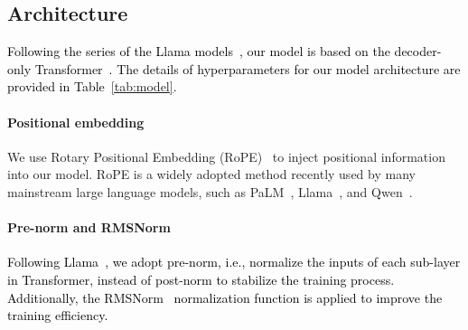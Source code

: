 \documentclass{article}
\begin{document}
\subsection{Architecture}
%

\textcolor{black}{
    Following the series of the Llama models~\citep{touvron2023llama,touvron2023llama2},
        our model is based on the decoder-only Transformer~\citep{vaswani2017transformer}.
    The details of hyperparameters for our model architecture are provided in Table~\ref{tab:model}.
}
\vspace{-10pt}
\begin{table}[htbp]
  \centering
  \normalsize
  \caption{ 
    The details of model architecture.
  }
  \label{tab:model}
\end{table}

%
\vspace{-1pt}
\paragraph{Positional embedding} 
We use Rotary Positional Embedding (RoPE)~\citep{su2021roformer} to inject positional information into our model.
RoPE is a widely adopted method recently used by many mainstream large language models, such as PaLM~\citep{anil2023palm}, Llama~\citep{touvron2023llama,touvron2023llama2}, and Qwen~\citep{bai2023qwen}.
\vspace{-1em}
\paragraph{Pre-norm and RMSNorm} 
\textcolor{black}{
%
Following Llama~\citep{touvron2023llama,touvron2023llama2},
    we adopt pre-norm, i.e., normalize the inputs of each sub-layer in Transformer, 
    instead of post-norm to stabilize the training process.
Additionally, the RMSNorm~\citep{DBLP:conf/nips/ZhangS19a} normalization function is applied to improve the training efficiency.
%
}
\vspace{-1em}
\end{document}
